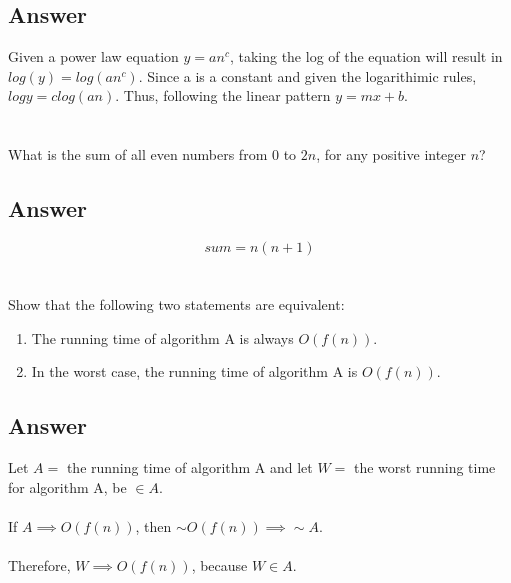 \documentclass{article}
\begin{document}
\subsection{Answer}

\begin{mdframed}
  Given a power law equation \(y = an^c\), taking the log of the equation will result
  in \(log(y) = log(an^c)\). Since a is a constant and given the logarithimic rules, \(logy =
  clog(an)\). Thus, following the linear pattern \(y = mx+b\).

\end{mdframed}

\section{}

What is the sum of all even numbers from \(0\) to \(2n\), for any positive integer \(n\)?

\subsection{Answer}

\begin{mdframed}

\begin{equation*}
  sum = n(n + 1)
\end{equation*}

\end{mdframed}

\section{}

Show that the following two statements are equivalent:
\begin{enumerate}[label=(\alph*)]
  \item The running time of algorithm A is always \(O(f(n))\).
  \item In the worst case, the running time of algorithm A is \(O(f(n))\).


\end{enumerate}


\subsection{Answer}

\begin{mdframed}
  Let \(A =\) the running time of algorithm A and let \(W =\) the worst running
  time for algorithm A, be \(\in A\). \\ \\ If \(A \implies O(f(n))\), then \(\sim O(f(n))
  \implies \sim A\). \\ \\
  Therefore, \(W \implies O(f(n))\), because \(W \in A\). 

\end{mdframed}
\end{document}
